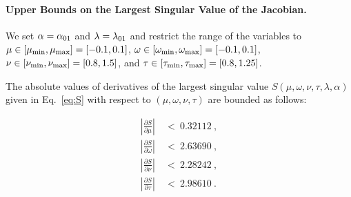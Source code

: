 \documentclass{article}
\begin{document}
\paragraph{Upper Bounds on the Largest Singular Value of the Jacobian.}

\begin{lemma}
\label{lem:Ds1Bounds}
We set
$\alpha = \alpha_{\rm 01}$ and $\lambda=\lambda_{\rm 01}$ and
restrict the range of the variables to
$\mu \in [\mu_{\rm min},\mu_{\rm max}]=[-0.1,0.1]$,
$\omega \in [\omega_{\rm min},\omega_{\rm max}]=[-0.1,0.1]$,
$\nu \in [\nu_{\rm min},\nu_{\rm max}]=[0.8,1.5]$, and
$\tau \in [\tau_{\rm min},\tau_{\rm max}]=[0.8,1.25]$.

The absolute values of derivatives of the largest singular value
$S(\mu,\omega,\nu,\tau,\lambda ,\alpha )$
given in Eq.~\eqref{eq:S} with respect to
$(\mu,\omega,\nu,\tau)$ are bounded as follows:



\begin{align}
\left|\frac{\partial S}{\partial \mu}\right| \ &< \ 0.32112 \ , \\
\left|\frac{\partial S}{\partial \omega}\right| \ &< \ 2.63690 \ , \\
\left|\frac{\partial S}{\partial \nu}\right| \ &< \ 2.28242 \ , \\
\left|\frac{\partial S}{\partial \tau}\right| \ &< \ 2.98610 \ .
\end{align}





\end{lemma}
\end{document}
